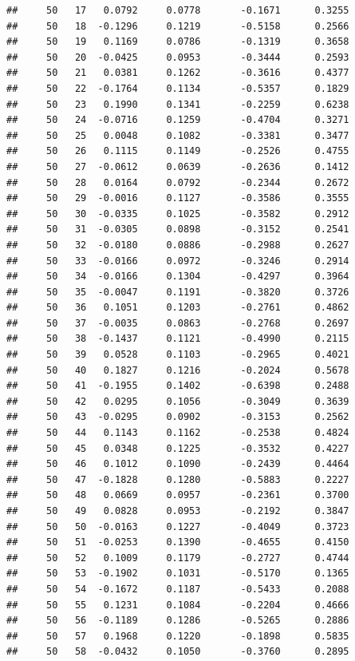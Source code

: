 \documentclass[
]{article}
\begin{document}
\begin{verbatim}
##     50   17   0.0792     0.0778       -0.1671      0.3255 
##     50   18  -0.1296     0.1219       -0.5158      0.2566 
##     50   19   0.1169     0.0786       -0.1319      0.3658 
##     50   20  -0.0425     0.0953       -0.3444      0.2593 
##     50   21   0.0381     0.1262       -0.3616      0.4377 
##     50   22  -0.1764     0.1134       -0.5357      0.1829 
##     50   23   0.1990     0.1341       -0.2259      0.6238 
##     50   24  -0.0716     0.1259       -0.4704      0.3271 
##     50   25   0.0048     0.1082       -0.3381      0.3477 
##     50   26   0.1115     0.1149       -0.2526      0.4755 
##     50   27  -0.0612     0.0639       -0.2636      0.1412 
##     50   28   0.0164     0.0792       -0.2344      0.2672 
##     50   29  -0.0016     0.1127       -0.3586      0.3555 
##     50   30  -0.0335     0.1025       -0.3582      0.2912 
##     50   31  -0.0305     0.0898       -0.3152      0.2541 
##     50   32  -0.0180     0.0886       -0.2988      0.2627 
##     50   33  -0.0166     0.0972       -0.3246      0.2914 
##     50   34  -0.0166     0.1304       -0.4297      0.3964 
##     50   35  -0.0047     0.1191       -0.3820      0.3726 
##     50   36   0.1051     0.1203       -0.2761      0.4862 
##     50   37  -0.0035     0.0863       -0.2768      0.2697 
##     50   38  -0.1437     0.1121       -0.4990      0.2115 
##     50   39   0.0528     0.1103       -0.2965      0.4021 
##     50   40   0.1827     0.1216       -0.2024      0.5678 
##     50   41  -0.1955     0.1402       -0.6398      0.2488 
##     50   42   0.0295     0.1056       -0.3049      0.3639 
##     50   43  -0.0295     0.0902       -0.3153      0.2562 
##     50   44   0.1143     0.1162       -0.2538      0.4824 
##     50   45   0.0348     0.1225       -0.3532      0.4227 
##     50   46   0.1012     0.1090       -0.2439      0.4464 
##     50   47  -0.1828     0.1280       -0.5883      0.2227 
##     50   48   0.0669     0.0957       -0.2361      0.3700 
##     50   49   0.0828     0.0953       -0.2192      0.3847 
##     50   50  -0.0163     0.1227       -0.4049      0.3723 
##     50   51  -0.0253     0.1390       -0.4655      0.4150 
##     50   52   0.1009     0.1179       -0.2727      0.4744 
##     50   53  -0.1902     0.1031       -0.5170      0.1365 
##     50   54  -0.1672     0.1187       -0.5433      0.2088 
##     50   55   0.1231     0.1084       -0.2204      0.4666 
##     50   56  -0.1189     0.1286       -0.5265      0.2886 
##     50   57   0.1968     0.1220       -0.1898      0.5835 
##     50   58  -0.0432     0.1050       -0.3760      0.2895 

\end{verbatim}
\end{document}
